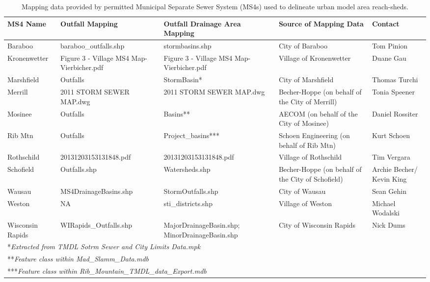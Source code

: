 \begin{landscape}
\begin{table}
\begin{center}
	\caption{Mapping data provided by permitted Municipal Separate Sewer System (MS4s) used to delineate urban model area reach-sheds.}
	\begin{tabular}{l p{3.5cm} p{3.5cm} p{4cm} p{3cm}}
	\hline
	MS4 Name	&	Outfall Mapping	&	Outfall Drainage Area Mapping	&	Source of Mapping Data	&	Contact	\\
	\hline	\hline
Baraboo 	 	 	& 	 	baraboo\_outfalls.shp	 	 & 	 	stormbasins.shp	 	 & 	 	City of Baraboo 	 	 & 	 	Tom Pinion \\ [0.25ex]
Kronenwetter	 	 & 	 	Figure 3 - Village MS4 Map-Vierbicher.pdf	 	 & 	 	Figure 3 - Village MS4 Map-Vierbicher.pdf	 	 & 	 	Village of Kronenwetter	 	 & 	 	Duane Gau \\[0.25ex]
Marshfield 	 	 & 	 	Outfalls  	 	 	& 	 	StormBasin*	 	 & 	 	City of Marshfield	 	 & 	 	Thomas Turchi \\[0.25ex]
Merrill 	 	 & 	 	2011 STORM SEWER MAP.dwg	 	 & 	 	2011 STORM SEWER MAP.dwg	 	 & 	 	Becher-Hoppe (on behalf of the City of Merrill)	 	 & 	 	Tonia Speener \\[0.25ex]
Mosinee	 	 	& 	 	Outfalls 	 	 	& 	 	Basins**	 	 & 	 	AECOM (on behalf of the City of Mosinee)	 	 & 	 	Daniel Rossiter \\[0.25ex]
Rib Mtn	 	 	& 	 	Outfalls 	 	 	& 	 	Project\_basins***	 	 & 	 	Schoen Engineering (on behalf of Rib Mtn)	 	 & 	 	Kurt Schoen \\[0.25ex]
Rothschild	 	 & 	 	20131203153131848.pdf	 	 & 	 	20131203153131848.pdf	 	 & 	 	Village of Rothschild	 	 & 	 	Tim Vergara \\[0.25ex]
Schofield	 	 & 	 	Outfalls.shp	 	 & 	 	Watersheds.shp	 	 & 	 	Becher-Hoppe (on behalf of the City of Schofield)	 	 & 	 	Archie Becher/ Kevin King \\[0.25ex]
Wausau	 	 	& 	 	MS4DrainageBasins.shp	 	 & 	 	StormOutfalls.shp	 	 & 	 	City of Wausau 	 	 & 	 	Sean Gehin \\[0.25ex]
Weston	 	 	& 	 	NA	 	 			& 	 	sti\_districts.shp	 	 & 	 	Village of Weston	 	 & 	 	Michael Wodalski \\[0.25ex]
Wisconsin Rapids	 						 & 	 	WIRapids\_Outfalls.shp	 	 & 	 	MajorDrainageBasin.shp; MinorDrainageBasin.shp	 	 & 	 	City of Wisconsin Rapids	 	 & 	 	Nick Dums \\[0.25ex]
		\hline
		\multicolumn{5}{l}{*\textit{Extracted from TMDL Sotrm Sewer and City Limits Data.mpk}} \\
		\multicolumn{5}{l}{**\textit{Feature class within Mad\_Slamm\_Data.mdb}} \\
		\multicolumn{5}{l}{***\textit{Feature class within Rib\_Mountain\_TMDL\_data\_Export.mdb}} \\
	\end{tabular}
\label{tab:reachshed_data}
\end{center}
\end{table}
\end{landscape}

